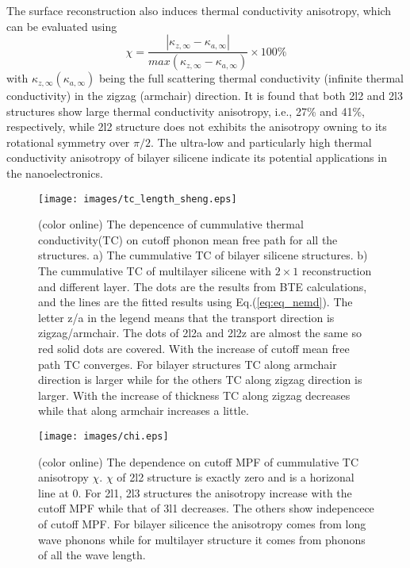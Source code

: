 \documentclass[aps,prb,twocolumn,showpacs,amsmath,amssymb]{revtex4-1}
\begin{document}
The surface reconstruction also induces thermal conductivity anisotropy, which can be evaluated using
\begin{equation}
  \chi=\frac{|\kappa_{z,\infty}-\kappa_{a,\infty} |}{ max⁡(\kappa_{z,\infty}-\kappa_{a,\infty} ) } \times 100 \%  \label{eq:eq_chi}
\end{equation}
with $ \kappa_{z,\infty} (\kappa_{a,\infty})$ being the full scattering thermal conductivity (infinite thermal conductivity) in the zigzag (armchair) direction.
It is found that both 2l2 and 2l3 structures show large thermal conductivity anisotropy, i.e., 27\% and 41\%, respectively, while 2l2 structure does not exhibits the anisotropy owning to its rotational symmetry over $\pi/2$.  The ultra-low and particularly high thermal conductivity anisotropy of bilayer silicene indicate its potential applications in the nanoelectronics.

\begin{figure}[b]
  \texttt{[image: images/tc\_length\_sheng.eps]}
  \caption{\label{fig:tc_length_sheng} (color online) The depencence of cummulative thermal conductivity(TC) on cutoff phonon mean free path for all the structures. a) The cummulative TC of bilayer silicene structures. b) The cummulative TC of multilayer silicene with $2\times 1$ reconstruction and different layer. The dots are the results from BTE calculations, and the lines are the fitted results using Eq.(\ref{eq:eq_nemd}). The letter z/a in the legend means that the transport direction is zigzag/armchair. The dots of 2l2a and 2l2z are almost the same so red solid dots are covered. With the increase of cutoff mean free path TC converges. For bilayer structures TC along armchair direction is larger while for the others TC along zigzag direction is larger. With the increase of thickness TC along zigzag decreases while that along armchair increases a little. }
\end{figure}

\begin{figure}[b]
  \texttt{[image: images/chi.eps]}{}
  \caption{\label{fig:chi} (color online) The dependence on cutoff MPF of cummulative TC anisotropy $\chi$. $\chi$ of 2l2 structure is exactly zero and is a horizonal line at 0. For 2l1, 2l3  structures the anisotropy increase with the cutoff MPF while that of 3l1 decreases. The others show indepencece of cutoff MPF. For bilayer silicence the anisotropy comes from long wave phonons while for multilayer structure it comes from phonons of all the wave length. }
\end{figure}
\end{document}
